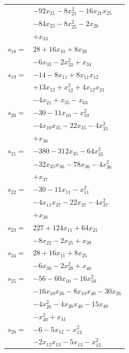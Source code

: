 \begin{longtable}{@{}r@{\;}l@{}}
 & \(\displaystyle -92x_{21} -8x_{21}^{2} -16x_{21}x_{25}\) \\
 & \(\displaystyle -84x_{25} -8x_{25}^{2} -2x_{26}\) \\
 & \(\displaystyle +x_{33}\) \\[3pt]
\(s_{18}=\) & \(\displaystyle 28 +16x_{10} +8x_{26}\) \\
 & \(\displaystyle -6x_{33} -2x_{33}^{2} +x_{34}\) \\[3pt]
\(s_{19}=\) & \(\displaystyle -14 -8x_{11} +8x_{11}x_{12}\) \\
 & \(\displaystyle +13x_{12} +x_{12}^{2} +4x_{12}x_{21}\) \\
 & \(\displaystyle -4x_{21} +x_{35} -x_{63}\) \\[3pt]
\(s_{20}=\) & \(\displaystyle -30 -11x_{10} -x_{10}^{2}\) \\
 & \(\displaystyle -4x_{10}x_{35} -22x_{35} -4x_{35}^{2}\) \\
 & \(\displaystyle +x_{36}\) \\[3pt]
\(s_{21}=\) & \(\displaystyle -380 -312x_{35} -64x_{35}^{2}\) \\
 & \(\displaystyle -32x_{35}x_{36} -78x_{36} -4x_{36}^{2}\) \\
 & \(\displaystyle +x_{37}\) \\[3pt]
\(s_{22}=\) & \(\displaystyle -30 -11x_{11} -x_{11}^{2}\) \\
 & \(\displaystyle -4x_{11}x_{37} -22x_{37} -4x_{37}^{2}\) \\
 & \(\displaystyle +x_{38}\) \\[3pt]
\(s_{23}=\) & \(\displaystyle 227 +124x_{11} +64x_{21}\) \\
 & \(\displaystyle -8x_{22} -2x_{25} +x_{39}\) \\[3pt]
\(s_{24}=\) & \(\displaystyle 28 +16x_{11} +8x_{25}\) \\
 & \(\displaystyle -6x_{39} -2x_{39}^{2} +x_{40}\) \\[3pt]
\(s_{25}=\) & \(\displaystyle -56 -60x_{10} -16x_{10}^{2}\) \\
 & \(\displaystyle -16x_{10}x_{26} -8x_{10}x_{40} -30x_{26}\) \\
 & \(\displaystyle -4x_{26}^{2} -4x_{26}x_{40} -15x_{40}\) \\
 & \(\displaystyle -x_{40}^{2} +x_{41}\) \\[3pt]
\(s_{26}=\) & \(\displaystyle -6 -5x_{12} -x_{12}^{2}\) \\
 & \(\displaystyle -2x_{12}x_{13} -5x_{13} -x_{13}^{2}\) \\

\end{longtable}
